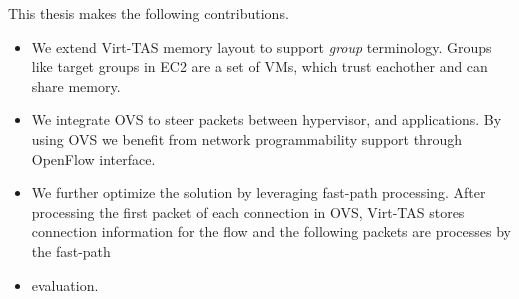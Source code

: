 This thesis makes the following contributions.
\begin{itemize}
    \item We extend Virt-TAS memory layout to support \emph{group} terminology. Groups 
    like target groups in EC2 are a set of VMs, which trust eachother and can share memory. 
    \item We integrate OVS to steer packets between hypervisor, and applications. By 
    using OVS we benefit from network programmability support through OpenFlow interface.
    \item We further optimize the solution by leveraging fast-path processing. After processing
    the first packet of each connection in OVS, Virt-TAS stores connection information 
    for the flow and the following packets are processes by the fast-path
    \item evaluation.
\end{itemize}





